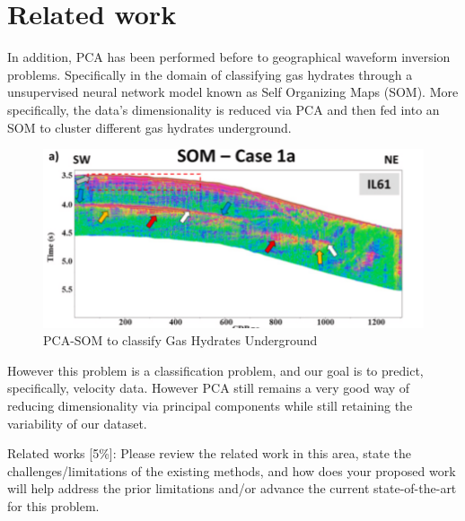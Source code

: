 \documentclass{article}
\newcommand{\instructions}[1]{{\color{blue} #1}}
\begin{document}
    


\section{Related work} 

    In addition, PCA has been performed before to geographical waveform inversion problems. Specifically in the domain of classifying gas hydrates through a unsupervised neural network model known as Self Organizing Maps (SOM). More specifically, the data's dimensionality is reduced via PCA and then fed into an SOM to cluster different gas hydrates underground.  

    \begin{figure}[H]
        \centering
        \includegraphics[width=0.5\linewidth]{figures/related1.png}
        \caption{PCA-SOM to classify Gas Hydrates Underground}
        \label{fig:related1}
    \end{figure}
    
    However this problem is a classification problem, and our goal is to predict, specifically, velocity data. However PCA still remains a very good way of reducing dimensionality via principal components while still retaining the variability of our dataset.


\instructions{Related works [5\%]: Please review the related work in this area, state the challenges/limitations of the existing methods, and how does your proposed work will help address the prior limitations and/or advance the current state-of-the-art for this problem.}
\end{document}
